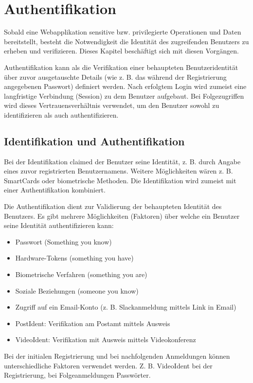 \chapter{Authentifikation}

Sobald eine Webapplikation sensitive bzw. privilegierte Operationen und Daten bereitstellt, besteht die Notwendigkeit die Identität des zugreifenden Benutzers zu erheben und verifizieren. Dieses Kapitel beschäftigt sich mit diesen Vorgängen.

Authentifikation kann als die Verifikation einer behaupteten Benutzeridentität über zuvor ausgetauschte Details (wie z. B. das während der Registrierung angegebenen Passwort) definiert werden. Nach erfolgtem Login wird zumeist eine langfristige Verbindung (Session) zu dem Benutzer aufgebaut. Bei Folgezugriffen wird dieses Vertrauensverhältnis verwendet, um den Benutzer sowohl zu identifizieren als auch authentifizieren.

\section{Identifikation und Authentifikation}

Bei der Identifikation claimed der Benutzer seine Identität, z. B. durch Angabe eines zuvor registrierten Benutzernamens. Weitere Möglichkeiten wären z. B. SmartCards oder biometrische Methoden. Die Identifikation wird zumeist mit einer Authentifikation kombiniert.

Die Authentifikation dient zur Validierung der behaupteten Identität des Benutzers. Es gibt mehrere Möglichkeiten (Faktoren) über welche ein Benutzer seine Identität authentifizieren kann:

\begin{itemize}
	\item Passwort (Something you know)
	\item Hardware-Tokens (something you have)
	\item Biometrische Verfahren (something you are)
	\item Soziale Beziehungen (someone you know)
	\item Zugriff auf ein Email-Konto (z. B. Slackanmeldung mittels Link in Email)
	\item PostIdent: Verifikation am Postamt mittels Ausweis
	\item VideoIdent: Verifikation mit Ausweis mittels Videokonferenz
\end{itemize}

Bei der initialen Registrierung und bei nachfolgenden Anmeldungen können unterschiedliche Faktoren verwendet werden. Z. B. VideoIdent bei der Registrierung, bei Folgeanmeldungen Passwörter.

